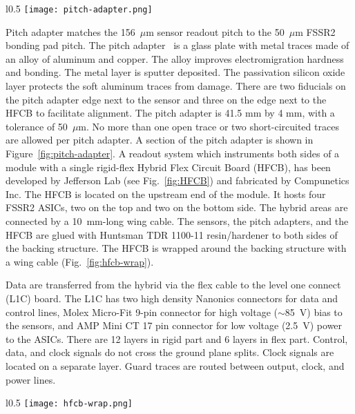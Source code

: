 \begin{wrapfigure}{l}{0.5\columnwidth}
\texttt{[image: pitch-adapter.png]}
\caption{One end of the pitch adapter mask, showing alignment fiducials, wire bonding pads, and traces.}
\label{fig:pitch-adapter}
\end{wrapfigure}

Pitch adapter matches the 156~$\mu$m sensor readout pitch to the 50~$\mu$m FSSR2 bonding pad pitch. The pitch adapter~\cite{PA} is a glass plate with metal traces made of an alloy of aluminum and copper. The alloy improves electromigration hardness and bonding. The metal layer is sputter deposited. The passivation silicon oxide layer protects the soft aluminum traces from damage. There are two fiducials on the pitch adapter edge next to the sensor
and three on the edge next to the HFCB to facilitate alignment. The pitch adapter is 41.5 mm by 4 mm, with a tolerance of 50~$\mu$m. No more than one open trace or two short-circuited traces are allowed per pitch adapter. A section of the pitch adapter is shown in Figure~\ref{fig:pitch-adapter}. 
A readout system which instruments both sides of a module with a single rigid-flex Hybrid Flex Circuit Board (HFCB), has been developed by Jefferson Lab (see Fig.~\ref{fig:HFCB}) and fabricated by Compunetics Inc. The HFCB is located on the upstream end of the module. It hosts four FSSR2 ASICs, two on the top and two on the bottom side. The hybrid areas are connected by a 10~mm-long wing cable. The sensors, the pitch adapters, and the HFCB are glued with Huntsman TDR 1100-11 resin/hardener to both sides of the backing structure. The HFCB is wrapped around the backing structure with a wing cable (Fig.~\ref{fig:hfcb-wrap}). 

Data are transferred from the hybrid via the flex cable to the level one connect (L1C) board. The L1C has two high density Nanonics connectors for data and control lines, Molex Micro-Fit 9-pin connector for high voltage ($\sim$85~V) bias to the sensors, and AMP Mini CT 17 pin connector for low voltage (2.5~V) power to the ASICs. There are 12 layers in rigid part and 6 layers in flex part. Control, data, and clock signals do not cross the ground plane splits. Clock signals are located on a separate layer. Guard traces are routed between output, clock, and power lines. 

\begin{wrapfigure}{l}{0.5\columnwidth}
\texttt{[image: hfcb-wrap.png]}
\caption{HFCB wrap}
\label{fig:hfcb-wrap}
\end{wrapfigure}

